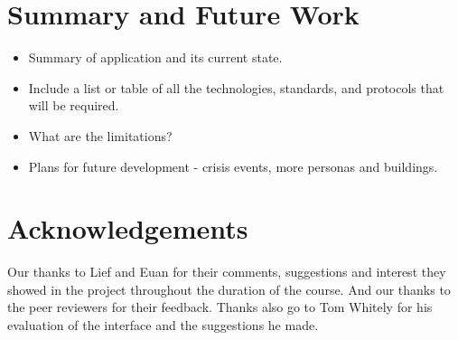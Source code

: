 \documentclass{sig-alt-release2}
\begin{document}
\section{Summary and Future Work}
\begin{itemize}

\item	Summary of application and its current state.

\item	Include a list or table of all the technologies, standards, and protocols that will be required.

\item	What are the limitations?

\item Plans for future development - crisis events, more personas and buildings.

\end{itemize}

\section{Acknowledgements}
Our thanks to Lief and Euan for their comments, suggestions and interest they showed in the project throughout the duration of the course. And our thanks to the peer reviewers for their feedback.
Thanks also go to Tom Whitely for his evaluation of the interface and the suggestions he made.



\end{document}
